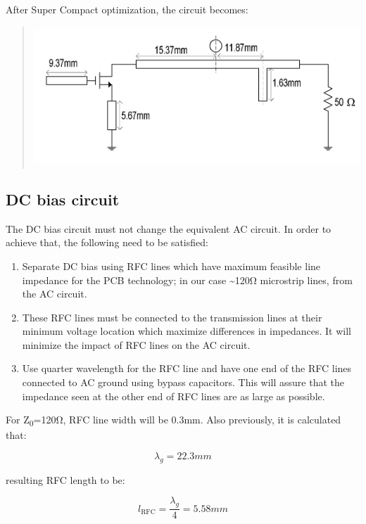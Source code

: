 After Super Compact optimization, the circuit becomes:

\begin{quote}
\includegraphics[width=5in,height=2.05556in]{media/image16.png}
\end{quote}

\hypertarget{dc-bias-circuit}{%
\subsection{\texorpdfstring{ DC bias
circuit}{ DC bias circuit}}\label{dc-bias-circuit}}

The DC bias circuit must not change the equivalent AC circuit. In order
to achieve that, the following need to be satisfied:

\begin{enumerate}
\def\labelenumi{\arabic{enumi}.}
\item
  Separate DC bias using RFC lines which have maximum feasible line
  impedance for the PCB technology; in our case \textasciitilde120Ω
  microstrip lines, from the AC circuit.
\item
  These RFC lines must be connected to the transmission lines at their
  minimum voltage location which maximize differences in impedances. It
  will minimize the impact of RFC lines on the AC circuit.
\item
  Use quarter wavelength for the RFC line and have one end of the RFC
  lines connected to AC ground using bypass capacitors. This will assure
  that the impedance seen at the other end of RFC lines are as large as
  possible.
\end{enumerate}

For Z\textsubscript{0}=120Ω, RFC line width will be 0.3mm. Also
previously, it is calculated that:

\[\lambda_{g} = 22.3mm\]

resulting RFC length to be:

\[l_{\text{RFC}} = \frac{\lambda_{g}}{4} = 5.58mm\]

